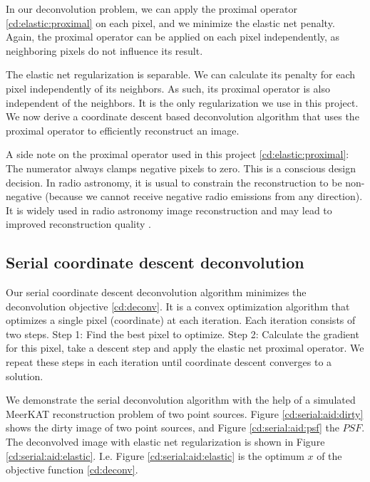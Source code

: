 In our deconvolution problem, we can apply the proximal operator \eqref{cd:elastic:proximal} on each pixel, and we minimize the elastic net penalty. Again, the proximal operator can be applied on each pixel independently, as neighboring pixels do not influence its result.

The elastic net regularization is separable. We can calculate its penalty for each pixel independently of its neighbors. As such, its proximal operator is also independent of the neighbors. It is the only regularization we use in this project. We now derive a coordinate descent based deconvolution algorithm that uses the proximal operator to efficiently reconstruct an image.

A side note on the proximal operator used in this project \eqref{cd:elastic:proximal}: The numerator always clamps negative pixels to zero. This is a conscious design decision. In radio astronomy, it is usual to constrain the reconstruction to be non-negative (because we cannot receive negative radio emissions from any direction). It is widely used in radio astronomy image reconstruction and may lead to improved reconstruction quality \cite{mcewen2011compressed}.


\subsection{Serial coordinate descent deconvolution}\label{cd:serial}
Our serial coordinate descent deconvolution algorithm minimizes the deconvolution objective \eqref{cd:deconv}. It is a convex optimization algorithm that optimizes a single pixel (coordinate) at each iteration. Each iteration consists of two steps. Step 1: Find the best pixel to optimize. Step 2: Calculate the gradient for this pixel, take a descent step and apply the elastic net proximal operator. We repeat these steps in each iteration until coordinate descent converges to a solution.

We demonstrate the serial deconvolution algorithm with the help of a simulated MeerKAT reconstruction problem of two point sources. Figure \ref{cd:serial:aid:dirty} shows the dirty image of two point sources, and Figure \ref{cd:serial:aid:psf} the $PSF$. The deconvolved image with elastic net regularization is shown in Figure \ref{cd:serial:aid:elastic}. I.e. Figure \ref{cd:serial:aid:elastic} is the optimum $x$ of the objective function \eqref{cd:deconv}.

